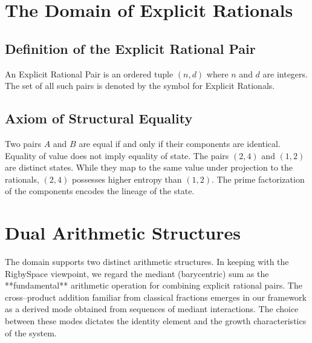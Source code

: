 \documentclass[11pt, letterpaper]{article}
\begin{document}
\section{The Domain of Explicit Rationals}

\subsection{Definition of the Explicit Rational Pair}
An Explicit Rational Pair is an ordered tuple $(n, d)$ where $n$ and $d$ are integers. The set of all such pairs is denoted by the symbol for Explicit Rationals.

\subsection{Axiom of Structural Equality}
Two pairs $A$ and $B$ are equal if and only if their components are identical. Equality of value does not imply equality of state. The pairs $(2, 4)$ and $(1, 2)$ are distinct states. While they map to the same value under projection to the rationals, $(2, 4)$ possesses higher entropy than $(1, 2)$. The prime factorization of the components encodes the lineage of the state.

\section{Dual Arithmetic Structures}

The domain supports two distinct arithmetic structures.  In keeping with the
RigbySpace viewpoint, we regard the mediant (barycentric) sum as the
**fundamental** arithmetic operation for combining explicit rational pairs.
The cross–product addition familiar from classical fractions emerges in our
framework as a derived mode obtained from sequences of mediant interactions.
The choice between these modes dictates the identity element and the growth
characteristics of the system.
\end{document}

